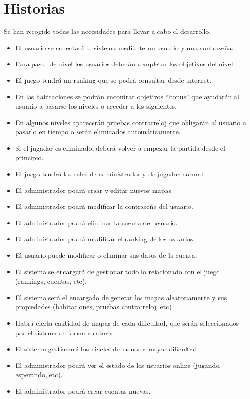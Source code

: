 \section{Historias}

Se han recogido todas las necesidades para llevar a cabo el desarrollo.
\begin{itemize}
	\item El usuario se conectará al sistema mediante un usuario y una contraseña.
	\item Para pasar de nivel los usuarios deberán completar los objetivos del nivel.
	\item El juego tendrá un ranking que se podrá consultar desde internet.
	\item En las habitaciones se podrán encontrar objetivos “bonus” que ayudarán al usuario a pasarse los niveles o acceder a los siguientes.
	\item En algunos niveles aparecerán pruebas contrarreloj que obligarán al usuario a pasarlo en tiempo o serán eliminados automáticamente.
	\item Si el jugador es eliminado, deberá volver a empezar la partida desde el principio.
	\item El juego tendrá los roles de administrador y de jugador normal.
	\item El administrador podrá crear y editar nuevos mapas.
	\item El administrador podrá modificar la contraseña del usuario.
	\item El administrador podrá eliminar la cuenta del usuario.
	\item El administrador podrá modificar el ranking de los usuarios.
	\item El usuario puede modificar o eliminar sus datos de la cuenta.
	\item El sistema se encargará de gestionar todo lo relacionado con el juego (rankings, cuentas, etc).
	\item El sistema será el encargado de generar los mapas aleatoriamente y sus propiedades (habitaciones, pruebas contrarreloj, etc).
	\item Habrá cierta cantidad de mapas de cada dificultad, que serán seleccionados por el sistema de forma aleatoria.
	\item El sistema gestionará los niveles de menor a mayor dificultad.
	\item El administrador podrá ver el estado de los usuarios online (jugando, esperando, etc).
	\item El administrador podrá crear cuentas nuevas.

\end{itemize}

